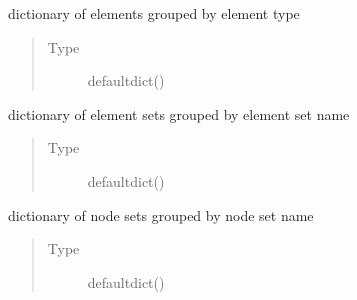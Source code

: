 \documentclass[letterpaper,10pt,english]{sphinxmanual}
\begin{document}
\begin{fulllineitems}
\begin{fulllineitems}
\begin{quote}
\begin{description}
\end{description}\end{quote}

\end{fulllineitems}


\begin{fulllineitems}
\label{\detokenize{pyCofea/api:cofea.PartMesh.elementsByType}}
dictionary of elements grouped by element type
\begin{quote}\begin{description}
\item[{Type}] \leavevmode
defaultdict()

\end{description}\end{quote}

\end{fulllineitems}


\begin{fulllineitems}
\label{\detokenize{pyCofea/api:cofea.PartMesh.elSet}}
dictionary of element sets grouped by element set name
\begin{quote}\begin{description}
\item[{Type}] \leavevmode
defaultdict()

\end{description}\end{quote}

\end{fulllineitems}


\begin{fulllineitems}
\label{\detokenize{pyCofea/api:cofea.PartMesh.nSet}}
dictionary of node sets grouped by node set name
\begin{quote}\begin{description}
\item[{Type}] \leavevmode
defaultdict()


\end{description}
\end{quote}
\end{fulllineitems}
\end{fulllineitems}
\end{document}
